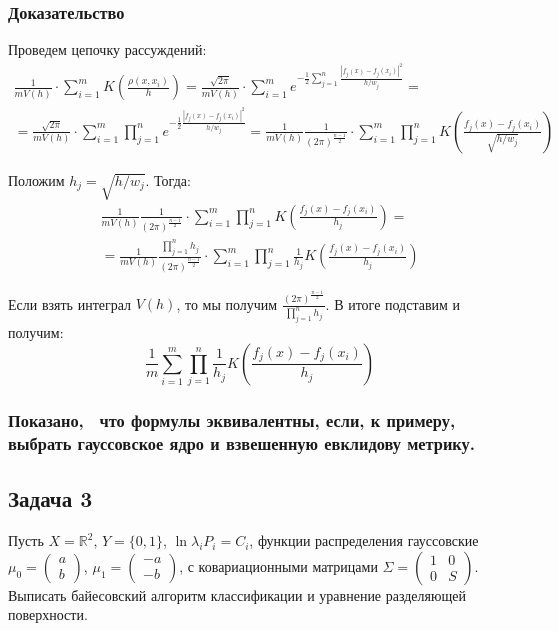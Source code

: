 \documentclass[12pt]{article}
\begin{document}
\subsubsection*{Доказательство}
Проведем цепочку рассуждений:
\begin{align*}
    \frac{1}{m V(h)} \cdot \sum_{i = 1}^{m} K\left(\frac{\rho(x,x_i)}{h}\right) =
    \frac{\sqrt{2 \pi}}{m V(h)} \cdot \sum_{i = 1}^{m} e^{-\frac{1}{2}\sum_{j = 1}^{n}\frac{|f_j(x) - f_j(x_i)|^2}{h / w_j}} = \\ =
    \frac{\sqrt{2 \pi}}{m V(h)} \cdot \sum_{i = 1}^{m} \prod_{j = 1}^{n} e^{-\frac{1}{2}\frac{|f_j(x) - f_j(x_i)|^2}{h / w_j}} =
    \frac{1}{m V(h)} \frac{1}{(2 \pi)^{\frac{n - 1}{2}}} \cdot \sum_{i = 1}^{m} \prod_{j = 1}^{n} K\left(\frac{f_j(x) - f_j(x_i)}{\sqrt{h / w_j}}\right)
\end{align*}

Положим $ h_j = \sqrt{h / w_j} $. Тогда:
\begin{align*}
    \frac{1}{m V(h)} \frac{1}{(2 \pi)^{\frac{n - 1}{2}}} \cdot \sum_{i = 1}^{m} \prod_{j = 1}^{n} K\left(\frac{f_j(x) - f_j(x_i)}{h_j}\right) = \\ =
    \frac{1}{m V(h)} \frac{\prod_{j = 1}^{n} h_j}{(2 \pi)^{\frac{n - 1}{2}}} \cdot \sum_{i = 1}^{m} \prod_{j = 1}^{n} \frac{1}{h_j} K\left(\frac{f_j(x) - f_j(x_i)}{h_j}\right)
\end{align*}

Если взять интеграл $ V(h) $, то мы получим $ \frac{(2 \pi)^{\frac{n - 1}{2}}}{\prod_{j=1}^{n} h_j} $. В итоге подставим и получим:
$$
    \frac{1}{m}\sum_{i = 1}^{m} \prod_{j = 1}^{n} \frac{1}{h_j} K\left(\frac{f_j(x) - f_j(x_i)}{h_j}\right)
$$

\subsubsection*{Показано,~ что формулы эквивалентны, если, к примеру, выбрать гауссовское ядро и взвешенную евклидову метрику.}

\subsection*{Задача 3}
Пусть $ X = \mathbb{R}^2 $, $ Y = \{0, 1\} $, $ \ln\lambda_i P_i = C_i $, функции
распределения гауссовские $ \mu_0 = \left( \begin{array}{c} a \\ b \end{array} \right) $,
$ \mu_1 = \left( \begin{array}{c} -a \\ -b \end{array} \right) $, с ковариационными
матрицами $ \Sigma = \left( \begin{array}{cc} 1 & 0 \\ 0 & S \end{array} \right) $.
Выписать байесовский алгоритм классификации и уравнение разделяющей поверхности.
\end{document}
